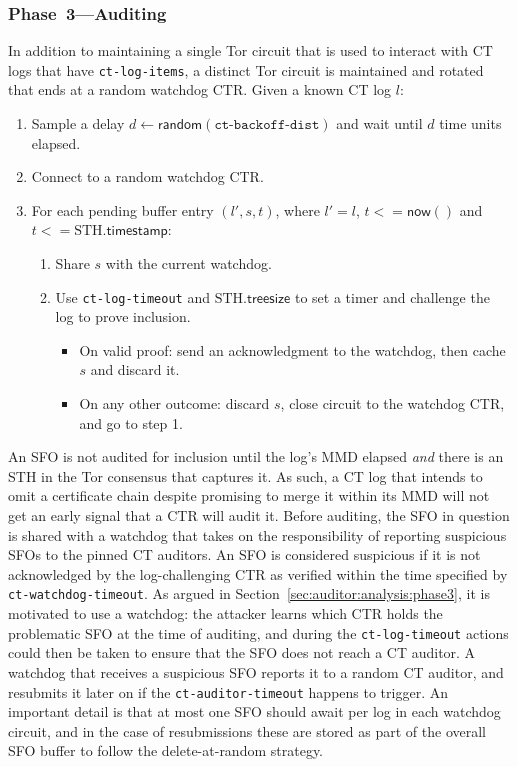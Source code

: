 \subsubsection{Phase~3---Auditing} \label{sec:auditor:design:phase3}
In addition to maintaining a single Tor circuit that is used to interact with
CT logs that have \texttt{ct-log-items}, a distinct Tor circuit is maintained
and rotated that ends at a random watchdog CTR.  Given a known CT log
$l$:
\begin{enumerate}
	\item\label{enm:ext:auditing:backoff} Sample a delay $d \gets
	\mathsf{random}(\texttt{ct-backoff-dist})$ and wait until $d$ time units
	elapsed.
	\item Connect to a random watchdog CTR.
	\item\label{enm:auditing:loop} For each pending buffer entry $(l',s,t)$,
	where $l' = l$, $t <= \mathsf{now}()$ and $t <=
	\textrm{STH}.\mathsf{timestamp}$:
		\begin{enumerate}
			\item\label{enm:ext:auditing:watchdog} Share $s$ with the current
				watchdog.
			\item\label{enm:ext:auditing:challenge} Use \texttt{ct-log-timeout}
				and $\textrm{STH}.\mathsf{treesize}$ to set a timer and
				challenge the log to prove inclusion.
				\begin{itemize}
					\item\label{enm:ext:auditing:challenge:success} On valid
						proof: send an acknowledgment to the watchdog, then
						cache $s$ and discard it.
					\item\label{enm:ext:auditing:challenge:fail} On any other
						outcome: discard $s$, close circuit to the watchdog CTR,
						and go to step 1.
				\end{itemize}
		\end{enumerate}
\end{enumerate}

An SFO is not audited for inclusion until the log's MMD elapsed \emph{and} there
is an STH in the Tor consensus that captures it.  As such, a CT log that intends
to omit a certificate chain despite promising to merge it within its MMD will
not get an early signal that a CTR will audit it.
Before auditing, the SFO in question is shared with a watchdog that takes on
the responsibility of reporting suspicious SFOs to the pinned CT auditors.
An SFO is considered suspicious if it is not acknowledged by the log-challenging
CTR as verified within the time specified by \texttt{ct-watchdog-timeout}.  As
argued in Section~\ref{sec:auditor:analysis:phase3}, it is motivated to use a
watchdog:
	the attacker learns which CTR holds the problematic SFO at the time of
		auditing, and
	during the \texttt{ct-log-timeout} actions could then be taken to ensure
		that the SFO does not reach a CT auditor.
A watchdog that receives a suspicious SFO reports it to a random CT auditor,
and resubmits it later on if the \texttt{ct-auditor-timeout} happens to
trigger.  An important detail is that at most one SFO should await per log in
each watchdog circuit, and in the case of resubmissions these are stored as part
of the overall SFO buffer to follow the delete-at-random strategy.

